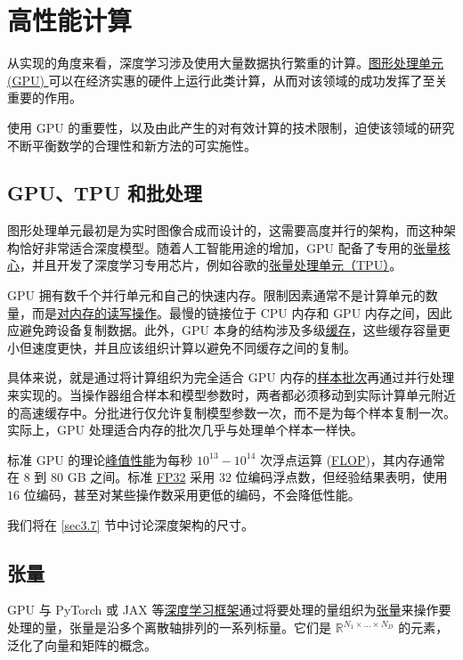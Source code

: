 \chapter{高性能计算}

从实现的角度来看，深度学习涉及使用大量数据执行繁重的计算。\underline{图形处理单元 (GPU) }可以在经济实惠的硬件上运行此类计算，从而对该领域的成功发挥了至关重要的作用。

使用 GPU 的重要性，以及由此产生的对有效计算的技术限制，迫使该领域的研究不断平衡数学的合理性和新方法的可实施性。

\section{GPU、TPU 和批处理}

图形处理单元最初是为实时图像合成而设计的，这需要高度并行的架构，而这种架构恰好非常适合深度模型。随着人工智能用途的增加，GPU 配备了专用的\underline{张量核心}，并且开发了深度学习专用芯片，例如谷歌的\underline{张量处理单元（TPU）}。

GPU 拥有数千个并行单元和自己的快速内存。限制因素通常不是计算单元的数量，而是\underline{对内存的读写操作}。最慢的链接位于 CPU 内存和 GPU 内存之间，因此应避免跨设备复制数据。此外，GPU 本身的结构涉及多级\underline{缓存}，这些缓存容量更小但速度更快，并且应该组织计算以避免不同缓存之间的复制。

具体来说，就是通过将计算组织为完全适合 GPU 内存的\underline{样本批次}再通过并行处理来实现的。当操作器组合样本和模型参数时，两者都必须移动到实际计算单元附近的高速缓存中。分批进行仅允许复制模型参数一次，而不是为每个样本复制一次。实际上，GPU 处理适合内存的批次几乎与处理单个样本一样快。

标准 GPU 的理论\underline{峰值性能}为每秒 $10^{13}-10^{14}$ 次浮点运算 (\underline{FLOP})，其内存通常在 $8$ 到 $80$ GB 之间。标准 \underline{FP32} 采用 $32$ 位编码浮点数，但经验结果表明，使用 $16$ 位编码，甚至对某些操作数采用更低的编码，不会降低性能。

我们将在 \ref{sec3.7} 节中讨论深度架构的尺寸。

\section{张量}

GPU 与 PyTorch 或 JAX 等\underline{深度学习框架}通过将要处理的量组织为\underline{张量}来操作要处理的量，张量是沿多个离散轴排列的一系列标量。它们是 $\mathbb{R}^{N_1 \times \dots \times N_D}$ 的元素，泛化了向量和矩阵的概念。

